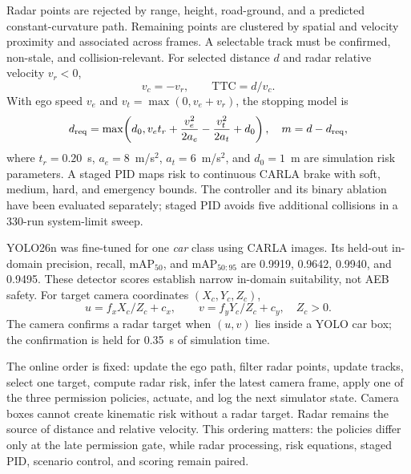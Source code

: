 \documentclass[conference]{IEEEtran}
\begin{document}
Radar points are rejected by range, height, road-ground, and a predicted
constant-curvature path. Remaining points are clustered by spatial and velocity
proximity and associated across frames. A selectable track must be confirmed,
non-stale, and collision-relevant. For selected distance $d$ and radar relative
velocity $v_r<0$,
\begin{equation}
 v_c=-v_r,\qquad \mathrm{TTC}=d/v_c.
\end{equation}
With ego speed $v_e$ and $v_t=\max(0,v_e+v_r)$, the stopping model is
\begin{equation}
 d_{\rm req}=\max\!\left(d_0,v_et_r+\frac{v_e^2}{2a_e}-
 \frac{v_t^2}{2a_t}+d_0\right),\quad m=d-d_{\rm req},
\end{equation}
where $t_r=0.20$~s, $a_e=8$~m/s$^2$, $a_t=6$~m/s$^2$, and $d_0=1$~m are
simulation risk parameters. A staged PID maps risk to continuous CARLA brake
with soft, medium, hard, and emergency bounds. The controller and its binary
ablation have been evaluated separately; staged PID avoids five additional
collisions in a 330-run system-limit sweep.

YOLO26n was fine-tuned for one \emph{car} class using CARLA images. Its held-out
in-domain precision, recall, $\mathrm{mAP}_{50}$, and
$\mathrm{mAP}_{50:95}$ are 0.9919, 0.9642, 0.9940, and 0.9495. These detector
scores establish narrow in-domain suitability, not AEB safety. For target
camera coordinates $(X_c,Y_c,Z_c)$,
\begin{equation}
 u=f_xX_c/Z_c+c_x,\qquad v=f_yY_c/Z_c+c_y,\quad Z_c>0.
\end{equation}
The camera confirms a radar target when $(u,v)$ lies inside a YOLO car box; the
confirmation is held for 0.35~s of simulation time.

The online order is fixed: update the ego path, filter radar points, update
tracks, select one target, compute radar risk, infer the latest camera frame,
apply one of the three permission policies, actuate, and log the next simulator
state. Camera boxes cannot create kinematic risk without a radar target. Radar
remains the source of distance and relative velocity. This ordering matters:
the policies differ only at the late permission gate, while radar processing,
risk equations, staged PID, scenario control, and scoring remain paired.
\end{document}
